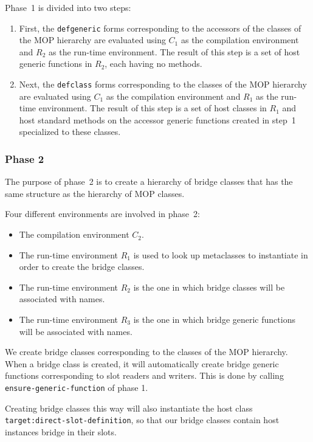 Phase~1 is divided into two steps:

\begin{enumerate}
\item First, the \texttt{defgeneric} forms corresponding to the
  accessors of the classes of the MOP hierarchy are evaluated using
  $C_1$ as the compilation environment and $R_2$ as the run-time
  environment.  The result of this step is a set of host generic
  functions in $R_2$, each having no methods.
\item Next, the \texttt{defclass} forms corresponding to the classes
  of the MOP hierarchy are evaluated using $C_1$ as the compilation
  environment and $R_1$ as the run-time environment.  The result of
  this step is a set of host classes in $R_1$ and host standard
  methods on the accessor generic functions created in step~1
  specialized to these classes.
\end{enumerate}

\subsubsection{Phase 2}

The purpose of phase~2 is to create a hierarchy of bridge classes that
has the same structure as the hierarchy of MOP classes.

Four different environments are involved in phase~2:

\begin{itemize}
\item The compilation environment $C_2$.
\item The run-time environment $R_1$ is used to look up metaclasses to
  instantiate in order to create the bridge classes.
\item The run-time environment $R_2$ is the one in which bridge
  classes will be associated with names.
\item The run-time environment $R_3$ is the one in which bridge
  generic functions will be associated with names.
\end{itemize}

We create bridge classes corresponding to the classes of the MOP
hierarchy.  When a bridge class is created, it will automatically
create bridge generic functions corresponding to slot readers and
writers.  This is done by calling \texttt{ensure-generic-function} of
phase 1.

Creating bridge classes this way will also instantiate the host class
\texttt{target:direct-slot-definition}, so that our bridge classes
contain host instances bridge in their slots. 

